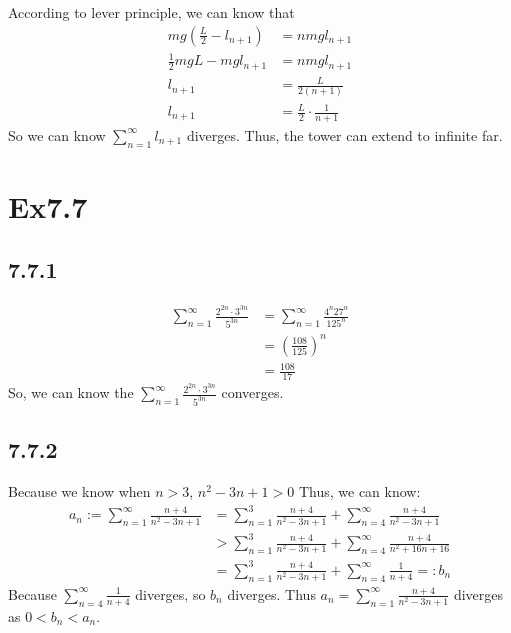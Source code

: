 \documentclass[11pt,twoside,a4paper]{article}
\begin{document}
    According to lever principle, we can know that 
\begin{equation}
    \begin{aligned}
        mg(\frac{L}{2}-l_{n+1})&=nmgl_{n+1}\\
        \frac{1}{2}mgL-mgl_{n+1}&=nmgl_{n+1}\\
        l_{n+1}&=\frac{L}{2(n+1)}\\
        l_{n+1}&=\frac{L}{2}\cdot\frac{1}{n+1}
    \end{aligned}
    \end{equation}
So we can know $\sum_{n = 1}^{\infty}l_{n+1} $ diverges. Thus, 
the tower can extend to infinite far.

\section{Ex7.7}
\subsection{7.7.1}
\begin{equation}
    \begin{aligned}
        \sum_{n = 1}^{\infty}  \frac{2^{2n}\cdot 3^{3n}}{5^{3n}}&=
        \sum_{n = 1}^{\infty} \frac{4^n 27^n}{125^n}\\
        &=(\frac{108}{125})^n\\
        &=\frac{108}{17}
    \end{aligned}
    \end{equation}
    So, we can know the $\displaystyle\sum_{n = 1}^{\infty}  \frac{2^{2n}\cdot 3^{3n}}{5^{3n}}$
    converges.
\subsection{7.7.2}
Because we know when $n>3$, $n^2-3n+1>0$
Thus, we can know:
\begin{equation}
    \begin{aligned}
        a_{n}:=\sum_{n = 1}^{\infty}  \frac{n+4}{n^2-3n+1}&=
        \sum_{n = 1}^{3}  \frac{n+4}{n^2-3n+1}+
        \sum_{n = 4}^{\infty}  \frac{n+4}{n^2-3n+1}\\
        &>\sum_{n = 1}^{3}  \frac{n+4}{n^2-3n+1}+
        \sum_{n = 4}^{\infty}  \frac{n+4}{n^2+16n+16}\\
        &=\sum_{n = 1}^{3}  \frac{n+4}{n^2-3n+1}+
        \sum_{n = 4}^{\infty}  \frac{1}{n+4}=:b_{n}
    \end{aligned}
    \end{equation}
Because $\displaystyle \sum_{n = 4}^{\infty}  \frac{1}{n+4}$ diverges, so $b_{n}$ diverges.
\newline
Thus $\displaystyle a_{n}=\sum_{n = 1}^{\infty}  \frac{n+4}{n^2-3n+1}$ diverges
as $0<b_{n}<a_{n}$.
\end{document}
